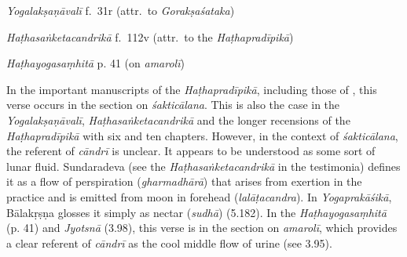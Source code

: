 \begin{ekdosis}

\begin{testimonia}[hp03_103]
\emph{Yogalakṣaṇāvalī} f.~31r  (attr.~to \emph{Gorakṣaśataka})
\begin{versinnote}
\end{versinnote}

\emph{Haṭhasaṅketacandrikā} f.~112v (attr.~to the \emph{Haṭhapradīpikā})
\begin{versinnote}
\end{versinnote}

\emph{Haṭhayogasaṃhitā} p. 41 (on \emph{amarolī})
\begin{versinnote}
\end{versinnote}
\end{testimonia}

\begin{philcomm}[hp03_103]
In the important manuscripts of the \emph{Haṭhapradīpikā}, including those of \textalpha, this verse occurs in the section on \emph{śakticālana}. This is also the case in the \emph{Yogalakṣaṇāvalī}, \emph{Haṭhasaṅketacandrikā} and the longer recensions of the \emph{Haṭhapradīpikā} with six and ten chapters. However, in the context of \emph{śakticālana}, the referent of \emph{cāndrī} is unclear. It appears to be understood as some sort of lunar fluid. Sundaradeva (see the \emph{Haṭhasaṅketacandrikā} in the testimonia) defines it as a flow of perspiration (\emph{gharmadhārā}) that arises from exertion in the practice and is emitted from moon in forehead (\emph{lalāṭacandra}). In \emph{Yogaprakāśikā}, Bālakṛṣṇa glosses it simply as nectar (\emph{sudhā}) (5.182). In the \emph{Haṭhayogasaṃhitā} (p. 41) and \emph{Jyotsnā} (3.98), this verse is in the section on \emph{amarolī}, which provides a clear referent of \emph{cāndrī} as the cool middle flow of urine (see 3.95).  


\end{philcomm}
\end{ekdosis}
